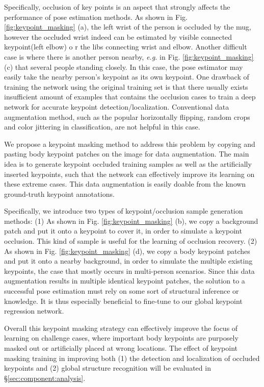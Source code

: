 \documentclass[runningheads]{llncs}
\begin{document}
Specifically, occlusion of key points is an aspect that strongly affects the performance of pose estimation methods. As shown in Fig. \ref{fig:keypoint_masking} (a), the left wrist of the person is occluded by the mug, however the occluded wrist indeed can be estimated by visible connected keypoint(left elbow) o r the libs connecting wrist and elbow. Another difficult case is where there is another person nearby, {\em e.g.} in Fig. \ref{fig:keypoint_masking} (c) that several people standing closely. In this case, the pose estimator may easily take the nearby person's keypoint as its own keypoint. 
One drawback of training the network using the original training set is that there usually exists insufficient amount of examples that contains the occlusion cases to train a deep network for accurate keypoint detection/localization. 
Conventional data augmentation method, such as the popular horizontally flipping, random crops and color jittering in classification, are not helpful in this case.


We propose a keypoint masking method to address this problem by copying and pasting body keypoint patches on the image for data augmentation. 
The main idea is to generate keypoint occluded training samples as well as the artificially inserted keypoints, such that the network can effectively improve its learning on these extreme cases. This data augmentation is easily doable from the known ground-truth keypoint annotations.

Specifically, we introduce two types of keypoint/occlusion sample generation methods: 
(1) As shown in Fig. \ref{fig:keypoint_masking} (b), we copy a background patch and put it onto a keypoint to cover it, in order to simulate a keypoint occlusion.
This kind of sample is useful for the learning of occlusion recovery. 
(2) As shown in Fig. \ref{fig:keypoint_masking} (d), we copy a body keypoint patches and put it onto a nearby background, in order to simulate the multiple existing keypoints, the case that mostly occurs in multi-person scenarios. 
Since this data augmentation results in multiple identical keypoint patches, the solution to a successful pose estimation must rely on some sort of structural inference or knowledge.
It is thus especially beneficial to fine-tune to our global keypoint regression network. 

Overall this keypoint masking strategy can effectively improve the focus of learning on challenge cases, where important body keypoints are purposely masked out or artificially placed at wrong locations. The effect of keypoint masking training in improving both (1) the detection and localization of occluded keypoints and (2) global structure recognition will be evaluated in \S\ref{sec:component:analysis}.
\end{document}
